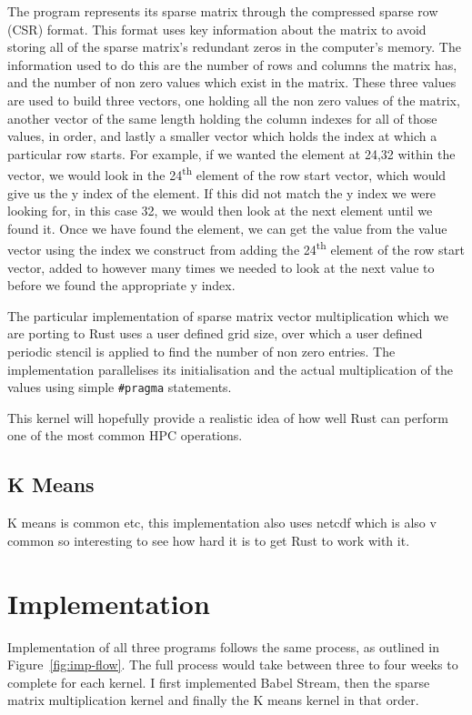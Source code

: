 The program represents its sparse matrix through the compressed sparse row (CSR) format. This format uses key information about the matrix to avoid storing all of the sparse matrix's redundant zeros in the computer's memory. The information used to do this are the number of rows and columns the matrix has, and the number of non zero values which exist in the matrix. These three values are used to build three vectors, one holding all the non zero values of the matrix, another vector of the same length holding the column indexes for all of those values, in order, and lastly a smaller vector which holds the index at which a particular row starts. For example, if we wanted the element at 24,32 within the vector, we would look in the 24\textsuperscript{th} element of the row start vector, which would give us the y index of the element. If this did not match the y index we were looking for, in this case 32, we would then look at the next element until we found it. Once we have found the element, we can get the value from the value vector using the index we construct from adding the 24\textsuperscript{th} element of the row start vector, added to however many times we needed to look at the next value to before we found the appropriate y index.

The particular implementation of sparse matrix vector multiplication which we are porting to Rust uses a user defined grid size, over which a user defined periodic stencil is applied to find the number of non zero entries. The implementation parallelises its initialisation and the actual multiplication of the values using simple \texttt{\#pragma} statements.

This kernel will hopefully provide a realistic idea of how well Rust can perform one of the most common HPC operations.

\subsection{K Means}

K means is common etc, this implementation also uses netcdf which is also v common so interesting to see how hard it is to get Rust to work with it.

\section{Implementation}
Implementation of all three programs follows the same process, as outlined in Figure~\ref{fig:imp-flow}. The full process would take between three to four weeks to complete for each kernel. I first implemented Babel Stream, then the sparse matrix multiplication kernel and finally the K means kernel in that order.

